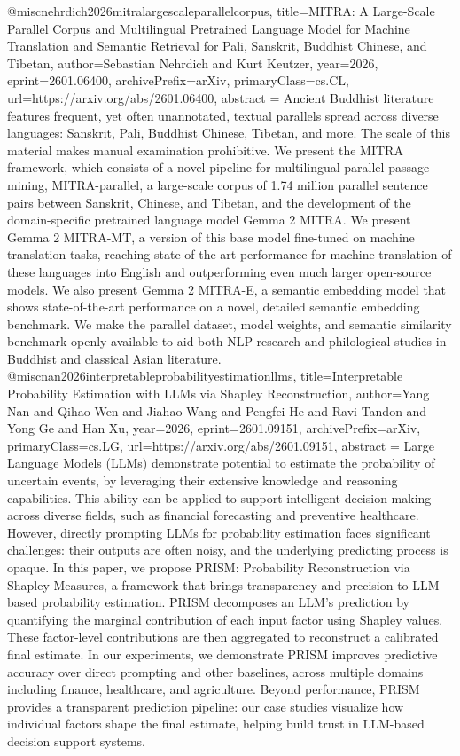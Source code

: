 {}@misc{nehrdich2026mitralargescaleparallelcorpus,
      title={MITRA: A Large-Scale Parallel Corpus and Multilingual Pretrained Language Model for Machine Translation and Semantic Retrieval for P\=ali, Sanskrit, Buddhist Chinese, and Tibetan}, 
      author={Sebastian Nehrdich and Kurt Keutzer},
      year={2026},
      eprint={2601.06400},
      archivePrefix={arXiv},
      primaryClass={cs.CL},
      url={https://arxiv.org/abs/2601.06400},
      abstract = {Ancient Buddhist literature features frequent, yet often unannotated, textual parallels spread across diverse languages: Sanskrit, Pāli, Buddhist Chinese, Tibetan, and more. The scale of this material makes manual examination prohibitive. We present the MITRA framework, which consists of a novel pipeline for multilingual parallel passage mining, MITRA-parallel, a large-scale corpus of 1.74 million parallel sentence pairs between Sanskrit, Chinese, and Tibetan, and the development of the domain-specific pretrained language model Gemma 2 MITRA. We present Gemma 2 MITRA-MT, a version of this base model fine-tuned on machine translation tasks, reaching state-of-the-art performance for machine translation of these languages into English and outperforming even much larger open-source models. We also present Gemma 2 MITRA-E, a semantic embedding model that shows state-of-the-art performance on a novel, detailed semantic embedding benchmark. We make the parallel dataset, model weights, and semantic similarity benchmark openly available to aid both NLP research and philological studies in Buddhist and classical Asian literature.}
}@misc{nan2026interpretableprobabilityestimationllms,
      title={Interpretable Probability Estimation with LLMs via Shapley Reconstruction}, 
      author={Yang Nan and Qihao Wen and Jiahao Wang and Pengfei He and Ravi Tandon and Yong Ge and Han Xu},
      year={2026},
      eprint={2601.09151},
      archivePrefix={arXiv},
      primaryClass={cs.LG},
      url={https://arxiv.org/abs/2601.09151},
      abstract = {Large Language Models (LLMs) demonstrate potential to estimate the probability of uncertain events, by leveraging their extensive knowledge and reasoning capabilities. This ability can be applied to support intelligent decision-making across diverse fields, such as financial forecasting and preventive healthcare. However, directly prompting LLMs for probability estimation faces significant challenges: their outputs are often noisy, and the underlying predicting process is opaque. In this paper, we propose PRISM: Probability Reconstruction via Shapley Measures, a framework that brings transparency and precision to LLM-based probability estimation. PRISM decomposes an LLM's prediction by quantifying the marginal contribution of each input factor using Shapley values. These factor-level contributions are then aggregated to reconstruct a calibrated final estimate. In our experiments, we demonstrate PRISM improves predictive accuracy over direct prompting and other baselines, across multiple domains including finance, healthcare, and agriculture. Beyond performance, PRISM provides a transparent prediction pipeline: our case studies visualize how individual factors shape the final estimate, helping build trust in LLM-based decision support systems.}
}
